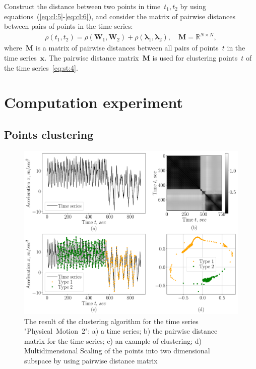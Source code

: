\documentclass[12pt, twoside]{article}
\numberwithin{equation}{section}
\begin{document}
Construct the distance between two points in time~$t_1, t_2$ by using equations~(\ref{eq:cl:5}-\ref{eq:cl:6}), and consider the matrix of pairwise distances between pairs of points in the time series:
\begin{equation}
\label{eq:cl:9}
\begin{aligned}
\rho\left(t_1, t_2\right) = \rho\left(\textbf{W}_1, \textbf{W}_2\right) + \rho\left(\bm{\lambda}_1, \bm{\lambda}_2\right), \quad \textbf{M} =  \mathbb{R}^{N\times N},
\end{aligned}
\end{equation}
where~$\textbf{M}$ is a matrix of pairwise distances between all pairs of points~$t$ in the time series~$\textbf{x}$.
The pairwise distance matrix~$\textbf{M}$ is used for clustering points~$t$ of the time series~\eqref{eq:st:4}.

\section{Computation experiment}
\subsection{Points clustering}
\begin{figure}[h!t]\center
\includegraphics[width=1\textwidth]{results_eng/experiment_clustering}
\caption{The result of the clustering algorithm for the time series "Physical~Motion~2": 
a) a time series; b) the pairwise distance matrix for the time series; c) an example of clustering; d) Multidimensional Scaling of the points into two dimensional subspace by using pairwise distance matrix}
\label{fig:experiment:1}
\end{figure}
\end{document}
